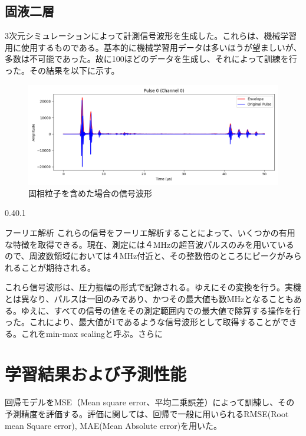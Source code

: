 \documentclass[uplatex]{suribt}
\makeatletter
\renewcommand{\subsection}{%
    \@startsection{subsection}{1}{\z@}%
    {0.4\Cvs}{0.1\Cvs}%
    {\normalfont\normalsize\headfont\raggedright}}
\makeatother
\begin{document}
\section{固液二層}
3次元シミュレーションによって計測信号波形を生成した。これらは、機械学習用に使用するものである。基本的に機械学習用データは多いほうが望ましいが、多数は不可能であった。故に100ほどのデータを生成し、それによって訓練を行った。その結果を以下に示す。
\begin{figure}[h]
    \centering
    \includegraphics[width=0.5\linewidth]{pictures/results/solid_liquid7_processed_0pulse.png}
    \caption{固相粒子を含めた場合の信号波形}
    \label{fig:solid_liquid}
\end{figure}

\subsection{フーリエ解析}
これらの信号をフーリエ解析することによって、いくつかの有用な特徴を取得できる。現在、測定には４MHzの超音波パルスのみを用いているので、周波数領域においては４MHz付近と、その整数倍のところにピークがみられることが期待される。

これら信号波形は、圧力振幅の形式で記録される。ゆえにその変換を行う。実機とは異なり、パルスは一回のみであり、かつその最大値も数MHzとなることもある。ゆえに、すべての信号の値をその測定範囲内での最大値で除算する操作を行った。これにより、最大値が1であるような信号波形として取得することができる。これをmin-max scalingと呼ぶ。さらに
\chapter{学習結果および予測性能}
回帰モデルをMSE（Mean square error、平均二乗誤差）によって訓練し、その予測精度を評価する。評価に関しては、回帰で一般に用いられるRMSE(Root mean Square error), MAE(Mean Absolute error)を用いた。
\end{document}
